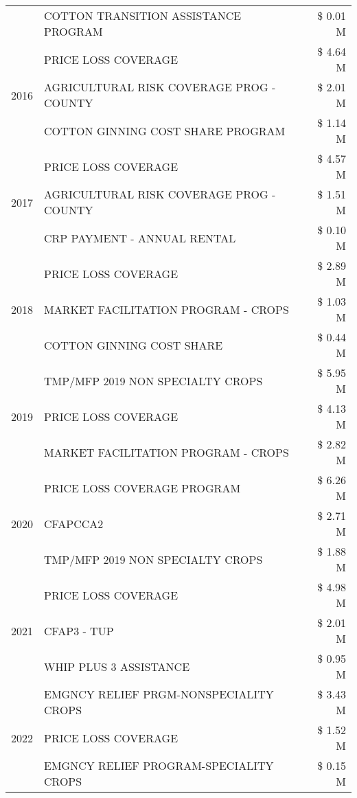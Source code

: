 \begin{tabular}{llr}
 & COTTON TRANSITION ASSISTANCE PROGRAM & \$ 0.01 M \\
\cline{1-3}
\multirow[t]{3}{*}{2016} & PRICE LOSS COVERAGE & \$ 4.64 M \\
 & AGRICULTURAL RISK COVERAGE PROG - COUNTY & \$ 2.01 M \\
 & COTTON GINNING COST SHARE PROGRAM & \$ 1.14 M \\
\cline{1-3}
\multirow[t]{3}{*}{2017} & PRICE LOSS COVERAGE & \$ 4.57 M \\
 & AGRICULTURAL RISK COVERAGE PROG - COUNTY & \$ 1.51 M \\
 & CRP PAYMENT - ANNUAL RENTAL & \$ 0.10 M \\
\cline{1-3}
\multirow[t]{3}{*}{2018} & PRICE LOSS COVERAGE & \$ 2.89 M \\
 & MARKET FACILITATION PROGRAM - CROPS & \$ 1.03 M \\
 & COTTON GINNING COST SHARE & \$ 0.44 M \\
\cline{1-3}
\multirow[t]{3}{*}{2019} & TMP/MFP 2019 NON SPECIALTY CROPS & \$ 5.95 M \\
 & PRICE LOSS COVERAGE & \$ 4.13 M \\
 & MARKET FACILITATION PROGRAM - CROPS & \$ 2.82 M \\
\cline{1-3}
\multirow[t]{3}{*}{2020} & PRICE LOSS COVERAGE PROGRAM & \$ 6.26 M \\
 & CFAPCCA2 & \$ 2.71 M \\
 & TMP/MFP 2019 NON SPECIALTY CROPS & \$ 1.88 M \\
\cline{1-3}
\multirow[t]{3}{*}{2021} & PRICE LOSS COVERAGE & \$ 4.98 M \\
 & CFAP3 - TUP & \$ 2.01 M \\
 & WHIP PLUS 3 ASSISTANCE & \$ 0.95 M \\
\cline{1-3}
\multirow[t]{3}{*}{2022} & EMGNCY RELIEF PRGM-NONSPECIALITY CROPS & \$ 3.43 M \\
 & PRICE LOSS COVERAGE & \$ 1.52 M \\
 & EMGNCY RELIEF PROGRAM-SPECIALITY CROPS & \$ 0.15 M \\
\cline{1-3}
\bottomrule
\end{tabular}
